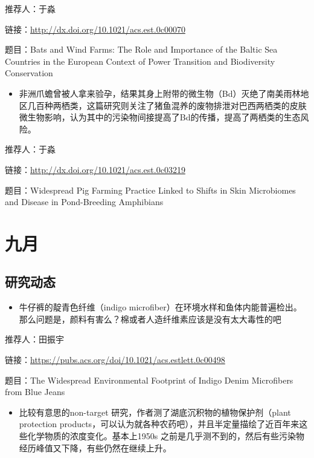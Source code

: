 \documentclass[
]{book}
\providecommand{\tightlist}{%
  \setlength{\itemsep}{0pt}\setlength{\parskip}{0pt}}
\begin{document}
推荐人：于淼

链接：\url{http://dx.doi.org/10.1021/acs.est.0c00070}

题目：Bats and Wind Farms: The Role and Importance of the Baltic Sea Countries in the European Context of Power Transition and Biodiversity Conservation

\begin{itemize}
\tightlist
\item
  非洲爪蟾曾被人拿来验孕，结果其身上附带的微生物（Bd）灭绝了南美雨林地区几百种两栖类，这篇研究则关注了猪鱼混养的废物排泄对巴西两栖类的皮肤微生物影响，认为其中的污染物间接提高了Bd的传播，提高了两栖类的生态风险。
\end{itemize}

推荐人：于淼

链接：\url{http://dx.doi.org/10.1021/acs.est.0c03219}

题目：Widespread Pig Farming Practice Linked to Shifts in Skin Microbiomes and Disease in Pond-Breeding Amphibians

\hypertarget{ux4e5dux6708-2}{%
\section*{九月}\label{ux4e5dux6708-2}}

\hypertarget{ux7814ux7a76ux52a8ux6001-34}{%
\subsection*{研究动态}\label{ux7814ux7a76ux52a8ux6001-34}}

\begin{itemize}
\tightlist
\item
  牛仔裤的靛青色纤维（indigo microfiber）在环境水样和鱼体内能普遍检出。那么问题是，颜料有害么？棉或者人造纤维素应该是没有太大毒性的吧
\end{itemize}

推荐人：田振宇

链接：\url{https://pubs.acs.org/doi/10.1021/acs.estlett.0c00498}

题目：The Widespread Environmental Footprint of Indigo Denim Microfibers from Blue Jeans

\begin{itemize}
\tightlist
\item
  比较有意思的non-target 研究，作者测了湖底沉积物的植物保护剂（plant protection products，可以认为就各种农药吧），并且半定量描绘了近百年来这些化学物质的浓度变化。基本上1950s 之前是几乎测不到的，然后有些污染物经历峰值又下降，有些仍然在继续上升。
\end{itemize}
\end{document}
